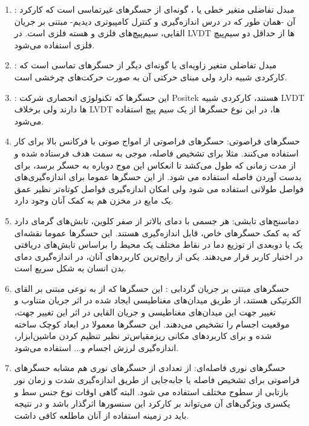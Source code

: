 \documentclass[conference]{IEEEtran-ModifiedForMVIP}
\begin{document}
\begin{enumerate}
	\item {}: مبدل تفاضلی متغیر خطی یا ، گونه‌ای از حسگر‌های غیرتماسی است  که  کارکرد آن -همان طور که در درس اندازه‌گیری و کنترل کامپیوتری دیدیم- مبتنی بر جریان القایی، سیم‌پیچ‌های فلزی و هسته فلزی است. در LVDT ها از حداقل دو سیم‌پیچ فلزی استفاده می‌شود. 
	\cite{varriohm_2020}
	
	\item {}: مبدل تفاضلی متغیر زاویه‌ای یا  گونه‌ای دیگر از حسگر‌های تماسی است که کارکردی شبیه  دارد ولی مبنای حرکتی آن به صورت حرکت‌های چرخشی است.
	\cite{varriohm_2020}
	
	\item
	:
	این حسگر‌ها که تکنولوژی انحصاری شرکت Positek هستند، کارکردی شبیه LVDT ها دارند ولی برخلاف LVDT ها، در این نوع حسگر‌ها از یک سیم پیچ استفاده می‌شود.
	\cite{varriohm_2020}
	
	\item
	حسگرهای فراصوتی: حسگرهای فراصوتی
	از امواج صوتی با فرکانس بالا برای کار استفاده می‌کنند. مثلا برای تشخیص فاصله، موجی به سمت هدف فرستاده شده و از مدت زمانی که طول می‌کشد تا انعکاس این موج دوباره به حسگر برسد، برای بدست آوردن فاصله استفاده می شود. از این حسگر‌ها عموما برای اندازه‌گیری‌های فواصل طولانی استفاده می شود ولی امکان اندازه‌گیری فواصل کوتاه‌تر نظیر عمق یک مایع در مخزن هم به کمک آنان وجود دارد. \cite{edwards_2017}
	
	\item دماسنج‌های تابشی:
	هر جسمی با دمای بالاتر از صفر کلوین، تابش‌های گرمای دارد که به کمک حسگر‌های خاص، قابل اندازه‌گیری هستند. این حسگر‌ها عموما نقشه‌ای یک یا دوبعدی از توزیع دما در نقاط مختلف یک محیط را براساس تابش‌های دریافتی در اختیار کاربر قرار می‌دهند. یکی از رایج‌ترین کاربردهای آنان، در اندازه‌گیری دمای بدن انسان به شکل سریع است. \cite{edwards_2017}
	
		\item حسگر‌های مبتنی بر جریان گردابی
	:
	این حسگر‌ها که از به نوعی مبتنی بر القای الکرتیکی هستند، از طریق میدان‌های مغناطیسی ایجاد شده در اثر جریان متناوب و تغییر جهت این میدان‌های مغناطیسی و جریان القایی در اثر این تغییر جهت، موقعیت اجسام را تشخیص می‌دهند. این حسگر‌ها معمولا در ابعاد کوچک ساخته شده و برای کاربرد‌های مکانی ریزمقیاس‌تر نظیر تنظیم کردن ماشین‌ابزار، اندازه‌گیری لرزش اجسام و... استفاده می‌شود.	\cite{ixthus_instrumentation_what_nodate}
	
	\item 
	حسگر‌های نوری فاصله‌ای: از تعدادی از حسگر‌های نوری هم مشابه حسگرهای فراصوتی برای تشخیص فاصله یا جابه‌جایی از طریق اندازه‌گیری شدت و زمان نور بازتابی از سطوح مختلف استفاده می شود. البته گاهی اوقات نوع جنس سط و یکسری ویژگی‌های آن می‌تواند بر کارکرد این سنسورها اثرگذار باشد و در نتیجه باید در زمینه استفاده از آنان ماطلعه کافی داشت.
	\cite{edwards_2017}
	

\end{enumerate}
\end{document}
